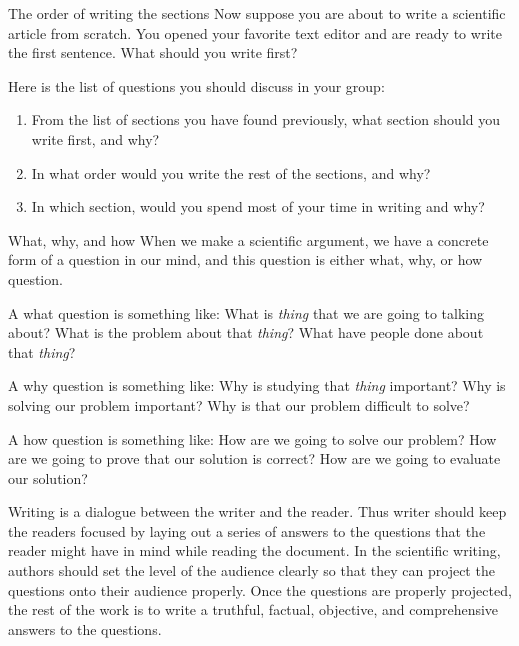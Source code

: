 \documentclass{beamer}
\begin{document}
\begin{frame}{The order of writing the sections}
Now suppose you are about to write a scientific article from scratch.
You opened your favorite text editor and are ready to write the first sentence.
What should you write first?
\end{frame}

\begin{frame}
Here is the list of questions you should discuss in your group:
\begin{enumerate}
    \item From the list of sections you have found previously, what section should you write first, and why?
    \item In what order would you write the rest of the sections, and why?
    \item In which section, would you spend most of your time in writing and why?
\end{enumerate}
\end{frame}

\begin{frame}{What, why, and how}
When we make a scientific argument, we have a concrete form of a question in our mind, and this question is either what, why, or how question.

A what question is something like: What is \textit{thing} that we are going to talking about? What is the problem about that \textit{thing}? What have people done about that \textit{thing}?

A why question is something like: Why is studying that \textit{thing} important? Why is solving our problem important? Why is that our problem difficult to solve?

A how question is something like: How are we going to solve our problem? How are we going to prove that our solution is correct? How are we going to evaluate our solution?
\end{frame}

\begin{frame}
Writing is a dialogue between the writer and the reader.
Thus writer should keep the readers focused by laying out a series of answers to the questions that the reader might have in mind while reading the document.
In the scientific writing, authors should set the level of the audience clearly so that they can project the questions onto their audience properly.
Once the questions are properly projected, the rest of the work is to write a truthful, factual, objective, and comprehensive answers to the questions.
\end{frame}
\end{document}
